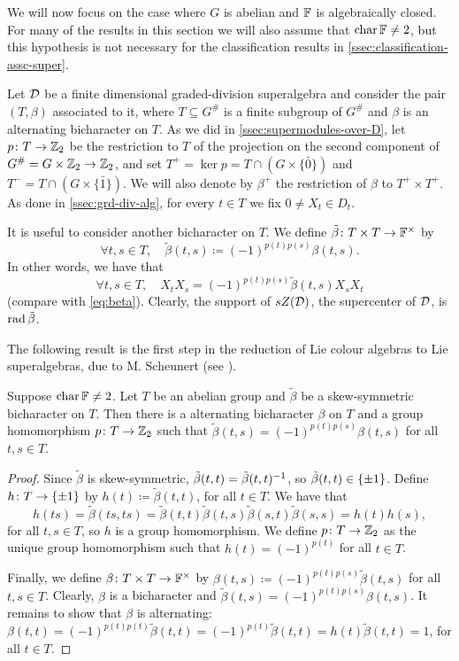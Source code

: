 We will now focus on the case where $G$ is abelian and $\mathbb{F}$ is algebraically closed. 
For many of the results in this section we will also assume that $\operatorname{char} \mathbb{F} \neq 2$, but this hypothesis is not necessary for the classification results in \cref{ssec:classification-assc-super}.

Let $\mathcal{D}$ be a finite dimensional graded-division superalgebra and consider the pair $(T, \beta)$ associated to it, where $T \subseteq G^\#$ is a finite subgroup of $G^\#$ and $\beta$ is an alternating bicharacter on $T$. 
As we did in \cref{ssec:supermodules-over-D}, let $p\colon T \to \mathbb{Z}_2$ be the restriction to $T$ of the projection on the second component of $G^\# = G\times \mathbb{Z}_2 \to \mathbb{Z}_2$, and set $T^+ = \ker p = T \cap (G \times \{ \bar 0 \})$ and $T^- = T \cap (G \times \{ \bar 1 \})$. 
We will also denote by $\beta^+$ the restriction of $\beta$ to $T^+ \times T^+$. 
As done in \cref{ssec:grd-div-alg}, for every $t\in T$ we fix $0 \neq X_t\in D_t$.

It is useful to consider another bicharacter on $T$. 
We define $\tilde\beta\colon T\times T \to \mathbb{F}^\times$ by
\[\label{eq:tilde-beta-def}
    \forall t, s\in T, \quad \tilde\beta(t,s) \coloneqq (-1)^{p(t)p(s)}\beta(t,s). 
\]
In other words, we have that
\[\label{eq:tilde-beta}
    \forall t, s\in T, \quad X_t X_s = (-1)^{p(t)p(s)} \tilde\beta(t,s) X_s X_t
\]
(compare with \cref{eq:beta}). 
Clearly, the support of $sZ(\mathcal{D})$, the supercenter of $\mathcal{D}$, is $\operatorname{rad} \tilde\beta$. 

The following result is the first step in the reduction of Lie colour algebras to Lie superalgebras, due to M. Scheunert (see \cite{MR529734}). 

\begin{prop}\label{prop:skew-bicharacter-grd-SA}
    Suppose $\operatorname{char} \mathbb{F} \neq 2$. 
    Let $T$ be an abelian group and $\tilde\beta$ be a skew-symmetric bicharacter on $T$. 
    Then there is a alternating bicharacter $\beta$ on $T$ and a group homomorphism $p\colon T \to \mathbb{Z}_2$ such that $\tilde\beta(t,s) = (-1)^{p(t)p(s)}\beta(t,s)$ for all $t,s\in T$.
\end{prop}

\begin{proof}
    Since $\tilde\beta$ is skew-symmetric, $\tilde\beta(t,t) = \tilde\beta(t,t)^{-1}$, so $\tilde\beta(t,t)\in \{ \pm 1 \}$. 
    Define $h\colon T \to \{ \pm 1 \}$ by $h(t) \coloneqq \tilde\beta(t,t)$, for all $t\in T$. 
    We have that 
    \[
        h(ts) = \tilde\beta(ts,ts) = \tilde\beta(t,t)\tilde\beta(t,s)\tilde\beta(s,t)\tilde\beta(s,s) = h(t)h(s),
    \] 
    for all $t,s \in T$, so $h$ is a group homomorphism. 
    We define $p\colon T \to \mathbb{Z}_2$ as the unique group homomorphism such that $h(t) = (-1)^{p(t)}$ for all $t\in T$. 
    
    Finally, we define $\beta\colon T\times T \to \mathbb{F}^\times$ by $\beta(t,s) \coloneqq (-1)^{p(t)p(s)}\tilde\beta(t,s)$ for all $t,s\in T$. 
    Clearly, $\beta$ is a bicharacter and $\tilde\beta(t,s) = (-1)^{p(t)p(s)}\beta(t,s)$. 
    It remains to show that $\beta$ is alternating: 
    $\beta(t,t) = (-1)^{p(t)p(t)}\tilde\beta(t,t) = (-1)^{p(t)}\tilde\beta(t,t) = h(t) \tilde\beta(t,t) = 1$, for all $t\in T$.
\end{proof}

